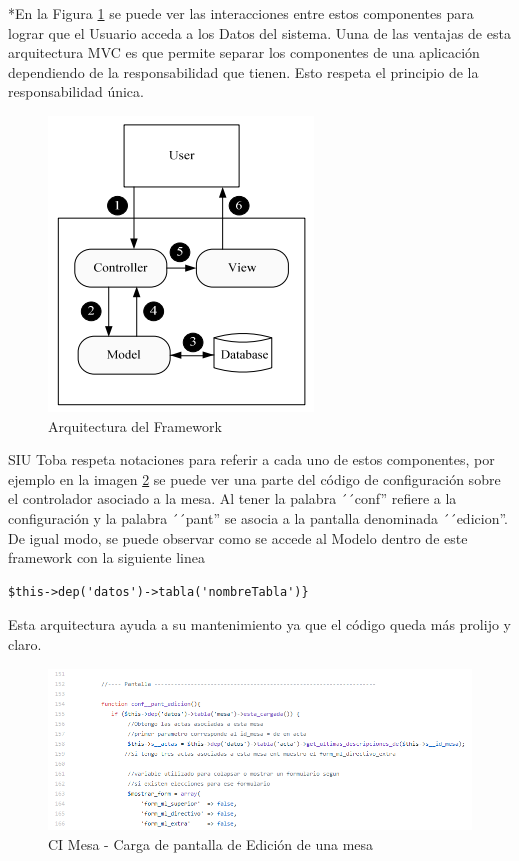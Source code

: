 *En la Figura \ref{graf:mvcArquitectura} se puede ver las interacciones entre estos componentes para lograr que el Usuario acceda a los Datos del sistema. Uuna de las ventajas de esta arquitectura MVC es que permite separar los componentes de una aplicación dependiendo de la responsabilidad que tienen. Esto respeta el principio de la responsabilidad única.

\begin{figure}[h!]
    \begin{center}
        \includegraphics[scale=0.5]{img/mvc_arq.png}
    \end{center}
  \caption{Arquitectura del Framework}
  \label{graf:mvcArquitectura}
\end{figure}

SIU Toba respeta notaciones para referir a cada uno de estos componentes, por ejemplo en la imagen \ref{graf:ejemploPantalla} se puede ver una parte del código de configuración sobre el controlador asociado a la mesa. Al tener la palabra ´´conf'' refiere a la configuración y la palabra ´´pant'' se asocia a la pantalla denominada ´´edicion''. De igual modo, se puede observar como se accede al Modelo dentro de este framework con la siguiente linea
\begin{lstlisting}
$this->dep('datos')->tabla('nombreTabla')}
\end{lstlisting}
Esta arquitectura ayuda a su mantenimiento ya que el código queda más prolijo y claro.

\begin{figure}[h!]
    \begin{center}
        \includegraphics[scale=0.5]{img/ejemplo_pantalla.png}
    \end{center}
  \caption{CI Mesa - Carga de pantalla de Edición de una mesa}
  \label{graf:ejemploPantalla}
\end{figure}

